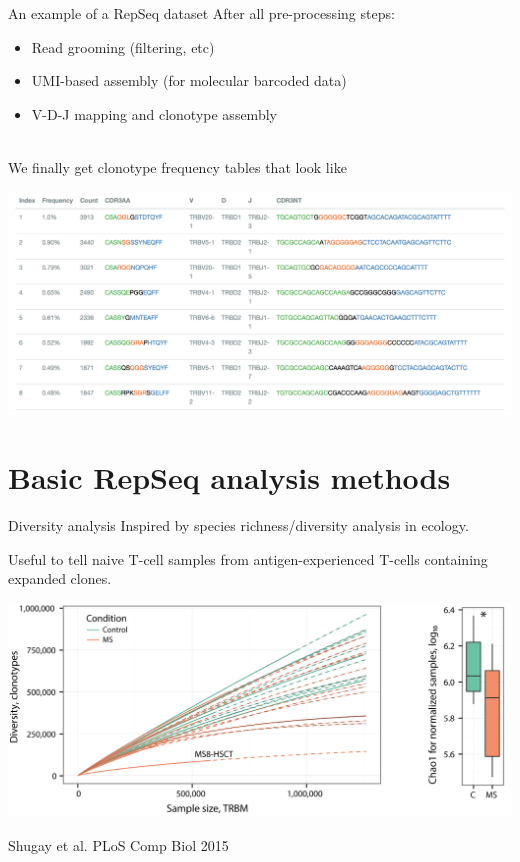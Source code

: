 \documentclass[12pt]{beamer}
\begin{document}
\begin{frame}{An example of a RepSeq dataset}
After all pre-processing steps:
\begin{itemize}
\item Read grooming (filtering, etc)
\item UMI-based assembly (for molecular barcoded data)
\item V-D-J mapping and clonotype assembly\\~\
\end{itemize}

\pause
We finally get clonotype frequency tables that look like
\begin{center}
\includegraphics[width=\textwidth]{p6}
\end{center}
\end{frame}

\section{Basic RepSeq analysis methods}

\begin{frame}{Diversity analysis}
Inspired by species richness/diversity analysis in ecology. 

Useful to tell naive T-cell samples from antigen-experienced T-cells containing expanded clones.

\begin{center}
\includegraphics[scale=0.25]{p10}
\end{center}
\tiny{Shugay et al. PLoS Comp Biol 2015}
\end{frame}
\end{document}
